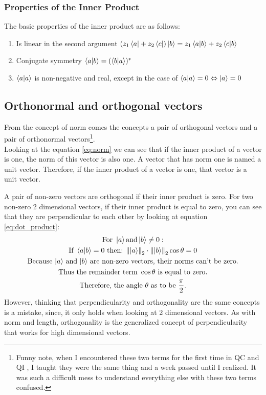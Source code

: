 \subsubsection{Properties of the Inner Product}
The basic properties of the inner product are as follows:
\begin{enumerate}
	\item Is linear in the second argument $ (z_1\bra{a}+ z_2\bra{c})\ket{b} = z_1\bra{a}\ket{b} + z_2\bra{c}\ket{b}$
	\item Conjugate symmetry $\bra{a}\ket{b} = (\bra{b}\ket{a})^*$
	\item $\bra{a}\ket{a}$ is non-negative and real, except in the case of $\bra{a}\ket{a} = 0 \Leftrightarrow \ket{a} = 0$
\end{enumerate}

 
\subsection{Orthonormal and orthogonal vectors}
From the concept of norm comes the concepts a pair of orthogonal vectors and a pair of orthonormal vectors\footnote{Funny note, when I encountered these two terms for the first time in QC and QI \tocite, I taught they were the same thing and a week passed until I realized. It was such a difficult mess to understand everything else with these two terms confused.}. \\
Looking at the equation \eqref{eq:norm} we can see that if the inner product of a vector is one, the norm of this vector is also one. A vector that has norm one is named a unit vector. Therefore, if the inner product of a vector is one, that vector is a unit vector.

A pair of non-zero vectors are orthogonal if their inner product is zero. For two non-zero 2 dimensional vectors, if their inner product is equal to zero, you can see that they are perpendicular to each other by looking at equation \eqref{eq:dot_product}:
\begin{multline*}
	 \text{For }\ket{a} \text{and} \ket{b}\neq 0 : \\
	\text{If }\bra{a}\ket{b} = 0 \text{ then: } \norm{\ket{a}}_2 \cdot \norm{\ket{b}}_2 \cos \theta = 0 \\
	 \text{Because $\ket{a}$ and $\ket{b}$ are non-zero vectors, their norms can't be zero.} \\
	 \text{Thus the remainder term } \cos\theta \text{ is equal to zero.} \\
	 \text{Therefore, the angle $\theta$ as to be } \frac{\pi}{2}. \\
\end{multline*}
However, thinking that perpendicularity and orthogonality are the same concepts is a mistake, since, it only holds when looking at 2 dimensional vectors. As with norm and length, orthogonality is the generalized concept of perpendicularity that works for high dimensional vectors.

